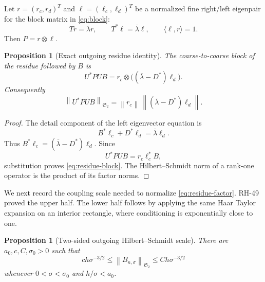 \documentclass[11pt]{article}
\newtheorem{proposition}[theorem]{Proposition}
\theoremstyle{definition}
\theoremstyle{remark}
\newcommand{\HS}{\mathfrak S_2}
\newcommand{\norm}[1]{\left\lVert #1\right\rVert}
\begin{document}
Let \(r=(r_c,r_d)^T\) and \(\ell=(\ell_c,\ell_d)^T\) be a normalized fine
right/left eigenpair for the block matrix in \eqref{eq:block}:
\[
 Tr=\lambda r,
 \qquad
 T^*\ell=\overline{\lambda}\ell,
 \qquad
 \langle\ell,r\rangle=1.
\]
Then \(P=r\otimes\ell\).

\begin{proposition}[Exact outgoing residue identity]
\label{prop:residue-identity}
The coarse-to-coarse block of the residue followed by \(B\) is
\begin{equation}
 \boxed{
 U^*PUB
 =
 r_c\otimes
 \bigl((\overline{\lambda}-D^*)\ell_d\bigr).}
 \label{eq:residue-block}
\end{equation}
Consequently
\begin{equation}
 \norm{U^*PUB}_{\HS}
 =
 \norm{r_c}\,
 \norm{(\overline{\lambda}-D^*)\ell_d}.
 \label{eq:residue-factor}
\end{equation}
\end{proposition}

\begin{proof}
The detail component of the left eigenvector equation is
\[
 B^*\ell_c+D^*\ell_d=\overline{\lambda}\ell_d.
\]
Thus \(B^*\ell_c=(\overline{\lambda}-D^*)\ell_d\).  Since
\[
 U^*PUB=r_c\ell_c^*B,
\]
substitution proves \eqref{eq:residue-block}.  The Hilbert--Schmidt norm of
a rank-one operator is the product of its factor norms.
\end{proof}

We next record the coupling scale needed to normalize
\eqref{eq:residue-factor}.  RH-49 proved the upper half.  The lower half
follows by applying the same Haar Taylor expansion on an interior rectangle,
where conditioning is exponentially close to one.

\begin{proposition}[Two-sided outgoing Hilbert--Schmidt scale]
\label{prop:B-two-sided}
There are \(a_0,c,C,\sigma_0>0\) such that
\begin{equation}
 c h\sigma^{-3/2}
 \le\norm{B_{n,\sigma}}_{\HS}
 \le C h\sigma^{-3/2}
 \label{eq:B-two-sided}
\end{equation}
whenever \(0<\sigma<\sigma_0\) and \(h/\sigma<a_0\).
\end{proposition}
\end{document}
